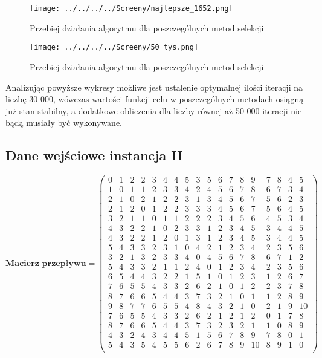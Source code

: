 \begin{figure}[h!]
		\texttt{[image: ../../../../Screeny/najlepsze\_1652.png]}
		\caption{Przebiej działania algorytmu dla poszczególnych metod selekcji}
		\label{ranking2pic}			
\end{figure}

\begin{figure}[h!]
		\texttt{[image: ../../../../Screeny/50\_tys.png]}
		\caption{Przebiej działania algorytmu dla poszczególnych metod selekcji}
		\label{ranking2picun}			
\end{figure}

Analizując powyższe wykresy możliwe jest ustalenie optymalnej ilości iteracji na liczbę 30 000, wówczas wartości funkcji celu w poszczególnych metodach osiągną już stan stabilny, a dodatkowe obliczenia dla liczby równej aż 50 000 iteracji nie bądą musiały być wykonywane.

\subsection{Dane wejściowe instancja II}

\par
$$
\mathbf{Macierz\_przepływu} =
\left( \begin{array}{cccccccccccccccccc}
0& 1& 2& 2& 3& 4& 4& 5& 3& 5& 6& 7& 8& 9& 7& 8& 4& 5\\
1& 0& 1& 1& 2& 3& 3& 4& 2& 4& 5& 6& 7& 8& 6& 7& 3& 4\\
2& 1& 0& 2& 1& 2& 2& 3& 1& 3& 4& 5& 6& 7& 5& 6& 2& 3\\
2& 1& 2& 0& 1& 2& 2& 3& 3& 3& 4& 5& 6& 7& 5& 6& 4& 5\\
3& 2& 1& 1& 0& 1& 1& 2& 2& 2& 3& 4& 5& 6& 4& 5& 3& 4\\
4& 3& 2& 2& 1& 0& 2& 3& 3& 1& 2& 3& 4& 5& 3& 4& 4& 5\\
4& 3& 2& 2& 1& 2& 0& 1& 3& 1& 2& 3& 4& 5& 3& 4& 4& 5\\
5& 4& 3& 3& 2& 3& 1& 0& 4& 2& 1& 2& 3& 4& 2& 3& 5& 6\\
3& 2& 1& 3& 2& 3& 3& 4& 0& 4& 5& 6& 7& 8& 6& 7& 1& 2\\
5& 4& 3& 3& 2& 1& 1& 2& 4& 0& 1& 2& 3& 4& 2& 3& 5& 6\\
6& 5& 4& 4& 3& 2& 2& 1& 5& 1& 0& 1& 2& 3& 1& 2& 6& 7\\
7& 6& 5& 5& 4& 3& 3& 2& 6& 2& 1& 0& 1& 2& 2& 3& 7& 8\\
8& 7& 6& 6& 5& 4& 4& 3& 7& 3& 2& 1& 0& 1& 1& 2& 8& 9\\
9& 8& 7& 7& 6& 5& 5& 4& 8& 4& 3& 2& 1& 0& 2& 1& 9& 10\\
7& 6& 5& 5& 4& 3& 3& 2& 6& 2& 1& 2& 1& 2& 0& 1& 7& 8\\
8& 7& 6& 6& 5& 4& 4& 3& 7& 3& 2& 3& 2& 1& 1& 0& 8& 9\\
4& 3& 2& 4& 3& 4& 4& 5& 1& 5& 6& 7& 8& 9& 7& 8& 0& 1\\
5& 4& 3& 5& 4& 5& 5& 6& 2& 6& 7& 8& 9& 10& 8& 9& 1& 0\\
\end{array} \right)
$$


